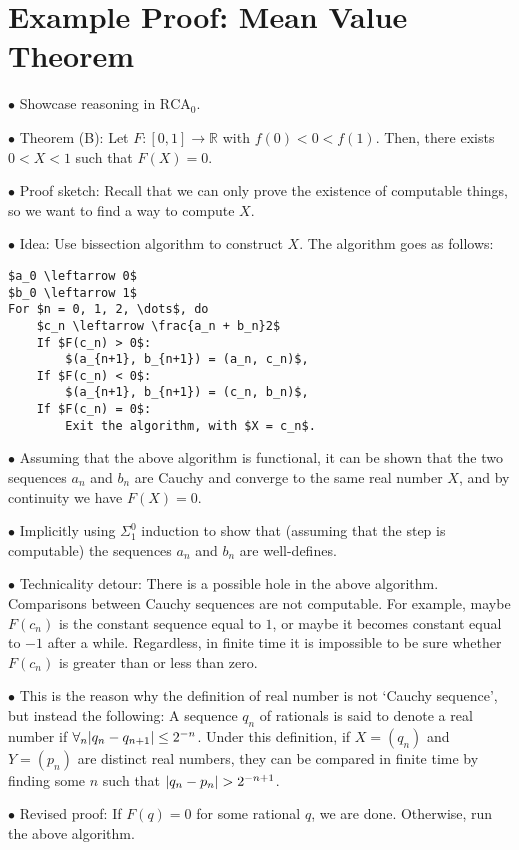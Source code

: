 \documentclass{article}
\theoremstyle{nonumberplain}
\newcommand{\R}{\mathbb{R}}
\newcommand{\RCA}{\mathrm{RCA}}
\DeclarePairedDelimiter{\abs}{\lvert}{\rvert}
\newcommand\point[1]{\noindent \hspace{\labelsep} $\bullet$ #1 \smallskip}
\newcommand\timestamp[1]{}
\begin{document}
\timestamp{35 minutes}

\section{Example Proof: Mean Value Theorem}

\point{Showcase reasoning in $\RCA_0$.}

\point{Theorem (B): Let $F \colon [0,1] \to \R$ with $f(0) < 0 < f(1)$. Then, there exists $0 < X < 1$ such that $F(X) = 0$.}

\point{Proof sketch: Recall that we can only prove the existence of computable things, so we want to find a way to compute $X$.}

\point{Idea: Use bissection algorithm to construct $X$. The algorithm goes as follows:}

\begin{lstlisting}
$a_0 \leftarrow 0$
$b_0 \leftarrow 1$
For $n = 0, 1, 2, \dots$, do
    $c_n \leftarrow \frac{a_n + b_n}2$
    If $F(c_n) > 0$:
        $(a_{n+1}, b_{n+1}) = (a_n, c_n)$,
    If $F(c_n) < 0$:
        $(a_{n+1}, b_{n+1}) = (c_n, b_n)$,
    If $F(c_n) = 0$:
        Exit the algorithm, with $X = c_n$.
\end{lstlisting}

\point{Assuming that the above algorithm is functional, it can be shown that the two sequences $a_n$ and $b_n$ are Cauchy and converge to the same real number $X$, and by continuity we have $F(X) = 0$.}

\point{Implicitly using $\Sigma^0_1$ induction to show that (assuming that the step is computable) the sequences $a_n$ and $b_n$ are well-defines.}

\point{Technicality detour: There is a possible hole in the above algorithm. Comparisons between Cauchy sequences are not computable. For example, maybe $F(c_n)$ is the constant sequence equal to $1$, or maybe it becomes constant equal to $-1$ after a while. Regardless, in finite time it is impossible to be sure whether $F(c_n)$ is greater than or less than zero.}

\point{This is the reason why the definition of real number is not `Cauchy sequence', but instead the following: A sequence $q_n$ of rationals is said to denote a real number if $\forall_n \abs{q_n - q_{n+1}} \leq 2^{-n}$. Under this definition, if $X = (q_n)$ and $Y = (p_n)$ are distinct real numbers, they can be compared in finite time by finding some $n$ such that $\abs{q_n - p_n} > 2^{-n+1}$.}

\point{Revised proof: If $F(q) = 0$ for some rational $q$, we are done. Otherwise, run the above algorithm.}
\end{document}

